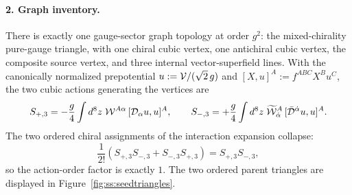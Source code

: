 \paragraph{2. Graph inventory.}
There is exactly one gauge-sector graph topology at order $g^{2}$: the mixed-chirality
pure-gauge triangle, with one chiral cubic vertex, one antichiral cubic
vertex, the composite source vertex, and three internal vector-superfield
lines. With the canonically normalized prepotential
$u:=\mathcal{V}/(\sqrt2\,g)$ and $[X,u]^{A}:=f^{ABC}X^{B}u^{C}$, the two cubic
actions generating the vertices are
\begin{equation}\label{eq:ss:seedcubic}
S_{+,3}=-\frac{g}{4}\int d^{8}z\;\mathcal{W}^{A\alpha}\,[\mathcal{D}_{\alpha}u,u]^{A},
\qquad
S_{-,3}=+\frac{g}{4}\int d^{8}z\;\widetilde{\mathcal{W}}^{A}_{\dot\alpha}\,
[\bar{\mathcal{D}}^{\dot\alpha}u,u]^{A}.
\end{equation}
The two ordered chiral assignments of the interaction expansion collapse:
\begin{equation}\label{eq:ss:seedactionorder}
\frac{1}{2!}\left(S_{+,3}S_{-,3}+S_{-,3}S_{+,3}\right)=S_{+,3}S_{-,3},
\end{equation}
so the action-order factor is exactly $1$. The two ordered parent triangles
are displayed in Figure~\ref{fig:ss:seedtriangles}.

